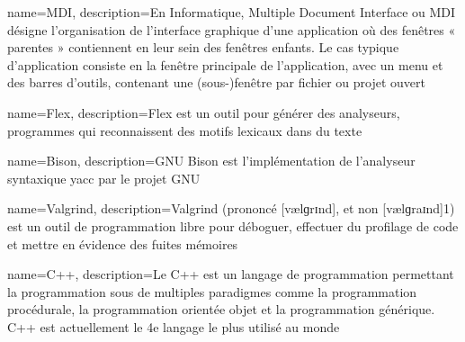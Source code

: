 \documentclass[a4paper, 12pt]{report}
\begin{document}
	{
		name={MDI},
		description={En Informatique, Multiple Document Interface ou MDI désigne l'organisation de l'interface graphique d'une application où des
		fenêtres « parentes » contiennent en leur sein des fenêtres enfants. Le cas typique d'application consiste en la fenêtre principale de l'application, avec un menu et des barres d'outils, contenant une (sous-)fenêtre par fichier ou projet ouvert}
	}

	{
		name={Flex},
		description={Flex est un outil pour générer des analyseurs, programmes qui reconnaissent des motifs lexicaux dans du texte}
	}

	{
		name={Bison},
		description={GNU Bison est l'implémentation de l'analyseur syntaxique yacc par le projet GNU}
	}

	{
		name={Valgrind},
		description={Valgrind (prononcé [vælɡrɪnd], et non [vælɡraɪnd]1) est un outil de programmation libre pour déboguer, effectuer du profilage 
		de code et mettre en évidence des fuites mémoires}
	}

	{
		name={C++},
		description={Le C++ est un langage de programmation permettant la programmation sous de multiples paradigmes comme la programmation
		procédurale, la programmation orientée objet et la programmation générique. C++ est actuellement le 4e langage le plus utilisé au monde}
	}
\end{document}
